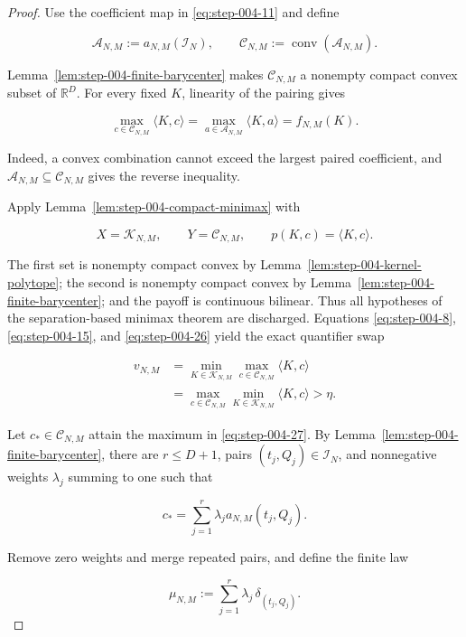 \begin{proof}
Use the coefficient map in \eqref{eq:step-004-11} and define

\[
\mathcal A_{N,M}:=a_{N,M}(\mathcal I_N),
\qquad
\mathcal C_{N,M}:=\operatorname{conv}(\mathcal A_{N,M}).
\]

Lemma~\ref{lem:step-004-finite-barycenter} makes
\(\mathcal C_{N,M}\) a nonempty compact convex subset of \(\mathbb R^D\).
For every fixed \(K\), linearity of the pairing gives

\[
\max_{c\in\mathcal C_{N,M}}\langle K,c\rangle
=
\max_{a\in\mathcal A_{N,M}}\langle K,a\rangle
=f_{N,M}(K).
\tag{S4.26}\label{eq:step-004-26}
\]

Indeed, a convex combination cannot exceed the largest paired coefficient,
and \(\mathcal A_{N,M}\subseteq\mathcal C_{N,M}\) gives the reverse
inequality.

Apply Lemma~\ref{lem:step-004-compact-minimax} with

\[
X=\mathcal K_{N,M},
\qquad
Y=\mathcal C_{N,M},
\qquad
p(K,c)=\langle K,c\rangle.
\]

The first set is nonempty compact convex by
Lemma~\ref{lem:step-004-kernel-polytope}; the second is nonempty compact
convex by Lemma~\ref{lem:step-004-finite-barycenter}; and the payoff is
continuous bilinear. Thus all hypotheses of the separation-based minimax
theorem are discharged. Equations \eqref{eq:step-004-8}, \eqref{eq:step-004-15}, and \eqref{eq:step-004-26} yield the exact
quantifier swap

\[
\begin{aligned}
v_{N,M}
&=\min_{K\in\mathcal K_{N,M}}
  \max_{c\in\mathcal C_{N,M}}\langle K,c\rangle\\
&=\max_{c\in\mathcal C_{N,M}}
  \min_{K\in\mathcal K_{N,M}}\langle K,c\rangle
>\eta.
\end{aligned}
\tag{S4.27}\label{eq:step-004-27}
\]

Let \(c_*\in\mathcal C_{N,M}\) attain the maximum in \eqref{eq:step-004-27}. By
Lemma~\ref{lem:step-004-finite-barycenter}, there are
\(r\le D+1\), pairs \((t_j,Q_j)\in\mathcal I_N\), and nonnegative weights
\(\lambda_j\) summing to one such that

\[
c_*=\sum_{j=1}^r\lambda_j a_{N,M}(t_j,Q_j).
\tag{S4.28}\label{eq:step-004-28}
\]

Remove zero weights and merge repeated pairs, and define the finite law

\[
\mu_{N,M}:=\sum_{j=1}^r\lambda_j\,\delta_{(t_j,Q_j)}.
\tag{S4.29}\label{eq:step-004-29}
\]


\end{proof}
